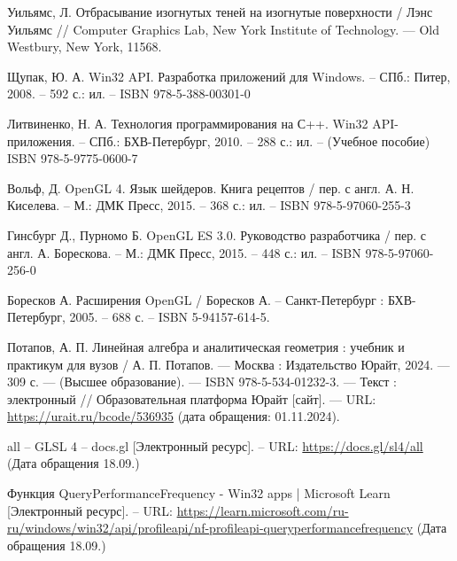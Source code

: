\renewcommand\bibname{СПИСОК ИСПОЛЬЗОВАННЫХ \hbox{ИСТОЧНИКОВ}}

\begin{thebibliography}{}

    Уильямс, Л. Отбрасывание изогнутых теней на изогнутые поверхности /
    Лэнс Уильямс // Computer Graphics Lab, New York Institute of Technology.
    — Old Westbury, New York, 11568.

    Щупак, Ю. А.
    Win32 API. Разработка приложений для Windows.
    -- СПб.: Питер, 2008. -- 592 с.: ил. -- ISBN 978-5-388-00301-0

    Литвиненко, Н. А.
    Технология программирования на С++. Win32 API-приложения.
    -- СПб.: БХВ-Петербург, 2010. -- 288 с.: ил. -- (Учебное пособие) ISBN 978-5-9775-0600-7

    Вольф, Д.
    OpenGL 4. Язык шейдеров. Книга рецептов / пер. с англ. А. Н. Киселева.
    -- М.: ДМК Пресс, 2015. – 368 с.: ил. -- ISBN 978-5-97060-255-3

    Гинсбург Д., Пурномо Б.
    OpenGL ES 3.0. Руководство разработчика / пер. с англ. А. Борескова.
    -- М.: ДМК Пресс, 2015. – 448 с.: ил. -- ISBN 978-5-97060-256-0

    Боресков А.
    Расширения OpenGL / Боресков А. -- Санкт-Петербург :
    БХВ-Петербург, 2005. -- 688 с.
    -- ISBN 5-94157-614-5.

    Потапов, А. П.  Линейная алгебра и аналитическая геометрия :
    учебник и практикум для вузов / А. П. Потапов. — Москва :
    Издательство Юрайт, 2024. — 309 с. — (Высшее образование).
    — ISBN 978-5-534-01232-3. — Текст :
    электронный // Образовательная платформа Юрайт [сайт].
    — URL: \url{https://urait.ru/bcode/536935} (дата обращения: 01.11.2024).

    all -- GLSL 4 -- docs.gl [Электронный ресурс].
    -- URL: \url{https://docs.gl/sl4/all}
    (Дата обращения 18.09.\the\year)

    Функция QueryPerformanceFrequency - Win32 apps | Microsoft Learn [Электронный ресурс].
    -- URL: \url{https://learn.microsoft.com/ru-ru/windows/win32/api/profileapi/nf-profileapi-queryperformancefrequency}
    (Дата обращения 18.09.\the\year)

\end{thebibliography}